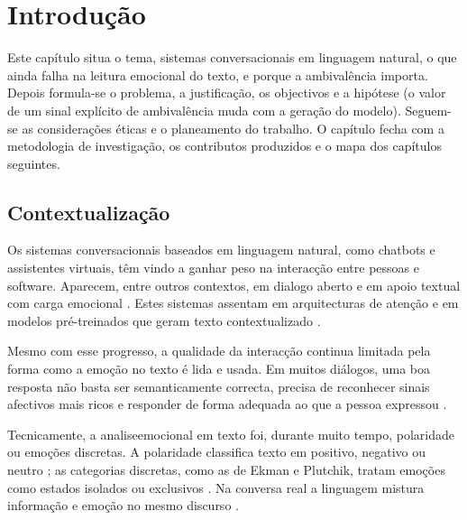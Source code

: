 
\chapter{Introdução}
\label{chap:Chapter1}

Este capítulo situa o tema, sistemas conversacionais em linguagem natural, o que ainda falha na leitura emocional do texto, e porque a ambivalência importa. Depois formula-se o problema, a justificação, os objectivos e a hipótese (o valor de um sinal explícito de ambivalência muda com a geração do modelo). Seguem-se as considerações éticas e o planeamento do trabalho. O capítulo fecha com a metodologia de investigação, os contributos produzidos e o mapa dos capítulos seguintes.


\section{Contextualização}
\label{sec:contextualizacao}

Os sistemas conversacionais baseados em linguagem natural, como chatbots e assistentes virtuais, têm vindo a ganhar peso na interacção entre pessoas e software. Aparecem, entre outros contextos, em \gls{dialogo} aberto e em apoio textual com carga emocional \parencite{Rashkin2019Empathy, Sharma2020Empathy, PlazaDelArco2024Trends}. Estes sistemas assentam em arquitecturas de atenção e em modelos pré-treinados que geram texto contextualizado \parencite{Vaswani2017Attention, Devlin2019BERT}.

Mesmo com esse progresso, a qualidade da interacção continua limitada pela forma como a emoção no \gls{texto} é lida e usada. Em muitos diálogos, uma boa resposta não basta ser semanticamente correcta, precisa de reconhecer sinais afectivos mais ricos e responder de forma adequada ao que a pessoa expressou \parencite{Rashkin2019Empathy}.

Tecnicamente, a \gls{analiseemocional} em texto foi, durante muito tempo, polaridade ou emoções discretas. A polaridade classifica texto em positivo, negativo ou neutro \parencite{Tan2023Survey}; as categorias discretas, como as de Ekman e Plutchik, tratam emoções como estados isolados ou exclusivos \parencite{Seyeditabari2018Review}. Na conversa real a linguagem mistura informação e emoção no mesmo \gls{discurso} \parencite{Wiebe2005Opinions}.

